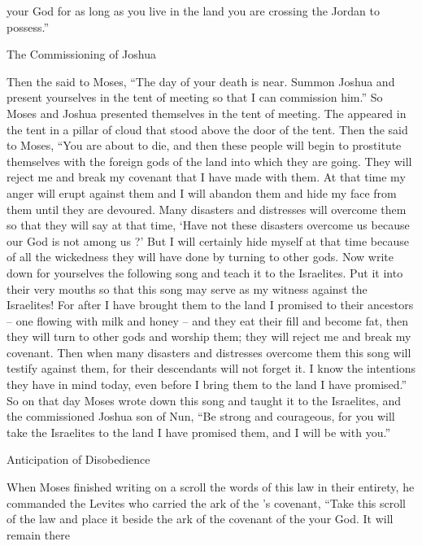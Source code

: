 {{}
your God
for as long
as you
live
in the land
you
are crossing
the
Jordan
to possess.”
\par }{\SH The Commissioning of Joshua
\par }{\PP {}Then the
{}
said to
Moses,
“The day
of your death
is near.
Summon
Joshua
and present
yourselves in the tent
of meeting
so that I can
commission
him.” So
Moses
and Joshua
presented themselves
in the tent
of meeting.
The
{}
appeared
in the tent
in a pillar
of cloud
that stood
above
the door
of the tent.
Then the
{}
said
to
Moses,
“You are about to die,
and then these
people
will begin
to prostitute
themselves with the foreign
gods
of the land
into which
they are going.
They will reject
me and break
my covenant
that
I have made
with them.
At that time
my anger
will erupt
against them and I will abandon
them and hide
my face
from them until they
are devoured.
Many
disasters
and distresses
will overcome them so that they will say
at that time,
‘Have not
these
disasters
overcome
us because
our God
is not
among us ?’
But I
will certainly
hide
myself at that time
because
of all
the wickedness
they will have
done
by turning
to
other
gods.
Now
write
down for yourselves the following
song
and teach
it to the Israelites.
Put
it into their very mouths
so
that this
song
may serve as my witness
against the Israelites!
For
after I have brought
them to
the land
I promised
to their ancestors
– one flowing
with milk
and honey
– and they eat
their fill
and become fat,
then they will turn
to
other
gods
and worship
them; they will reject
me and break
my covenant.
Then
when
many
disasters
and distresses
overcome them this
song
will testify
against them, for
their descendants
will not
forget
it. I know
the
intentions
they have
in mind today,
even before
I bring
them to
the land
I have
promised.”
So on that day
Moses
wrote
down this
song
and taught
it to the Israelites,
and the
{} commissioned
Joshua
son
of Nun,
“Be strong
and courageous,
for
you
will take
the Israelites
to
the land
I have
promised
them, and I
will be
with you.”
\par }{\SH Anticipation of Disobedience
\par }{\PP {}When
Moses
finished
writing
on
a scroll
the words
of this
law in their entirety,
he
commanded
the Levites
who carried
the ark
of the
{}’s
covenant,
“Take
this
scroll
of the law
and place
it beside
the ark
of the covenant
of the {}
your God.
It will
remain there
}
